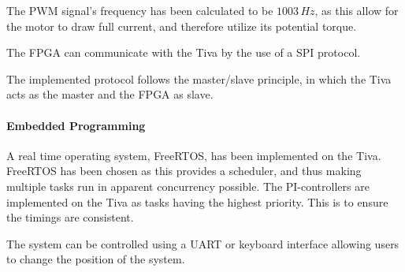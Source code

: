 \documentclass[../../main]{subfiles}
\begin{document}
The PWM signal's frequency has been calculated to be $1003 \si{\,Hz}$, as this allow for the motor to draw full current, and therefore utilize its potential torque.

The FPGA can communicate with the Tiva by the use of a SPI protocol.

The implemented protocol follows the master/slave principle, in which the Tiva acts as the master and the FPGA as slave.

\paragraph{Embedded Programming}
A real time operating system, FreeRTOS, has been implemented on the Tiva. FreeRTOS has been chosen as this provides a scheduler, and thus making multiple tasks run in apparent concurrency possible.
The PI-controllers are implemented on the Tiva as tasks having the highest priority. This is to ensure the timings are consistent.

The system can be controlled using a UART or keyboard interface allowing users to change the position of the system.
\end{document}
